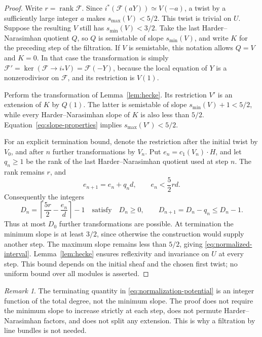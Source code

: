 \documentclass[11pt,reqno]{amsart}
\numberwithin{equation}{section}
\theoremstyle{definition}
\theoremstyle{remark}
\newtheorem{remark}[theorem]{Remark}
\newcommand{\FF}{\mathcal F}
\newcommand{\rk}{\operatorname{rank}}
\newcommand{\smax}{s_{\max}}
\newcommand{\smin}{s_{\min}}
\begin{document}
\begin{proof}
Write $r=\rk\FF$. Since
$i^*(\FF(aY))\simeq V(-a)$, a twist by a sufficiently large integer
$a$ makes $\smax(V)<5/2$. This twist is trivial on $U$.
Suppose the resulting $V$ still has $\smin(V)<3/2$. Take the last
Harder--Narasimhan quotient $Q$, so $Q$ is semistable of slope
$\smin(V)$, and write $K$ for the preceding step of the filtration.
If $V$ is semistable, this notation allows $Q=V$ and $K=0$.
In that case the transformation is simply
$\FF'=\ker(\FF\to i_*V)=\FF(-Y)$, because the local equation of $Y$
is a nonzerodivisor on $\FF$, and its restriction is $V(1)$.

Perform the transformation of Lemma~\ref{lem:hecke}. Its restriction
$V'$ is an extension of $K$ by $Q(1)$. The latter is semistable of
slope $\smin(V)+1<5/2$, while every Harder--Narasimhan slope of $K$
is also less than $5/2$. Equation~\eqref{eq:slope-properties} implies
$\smax(V')<5/2$.

For an explicit termination bound, denote the restriction after the
initial twist by $V_0$, and after $n$ further transformations by $V_n$.
Put $e_n=c_1(V_n)\cdot H$, and let $q_n\geq1$ be the rank of the last
Harder--Narasimhan quotient used at step $n$. The rank remains $r$, and
\[
 e_{n+1}=e_n+q_nd,\qquad e_n<\frac52rd.
\]
Consequently the integers
\begin{equation}\label{eq:normalization-potential}
 D_n=\left\lceil\frac{5r}{2}-\frac{e_n}{d}\right\rceil-1
 \quad\text{satisfy}\quad
 D_n\geq0,\qquad D_{n+1}=D_n-q_n\leq D_n-1.
\end{equation}
Thus at most $D_0$ further transformations are possible. At termination
the minimum slope is at least $3/2$, since otherwise the construction
would supply another step. The maximum slope remains less than $5/2$,
giving \eqref{eq:normalized-interval}. Lemma~\ref{lem:hecke} ensures
reflexivity and invariance on $U$ at every step. This bound depends on
the initial sheaf and the chosen first twist; no uniform bound over all
modules is asserted.
\end{proof}

\begin{remark}\label{rem:no-splitting}
The terminating quantity in \eqref{eq:normalization-potential} is an
integer function of the total degree, not the minimum slope.
The proof does not require the minimum slope to increase strictly at
each step, does not permute Harder--Narasimhan factors, and does not
split any extension. This is why a filtration by line bundles is not
needed.
\end{remark}
\end{document}
